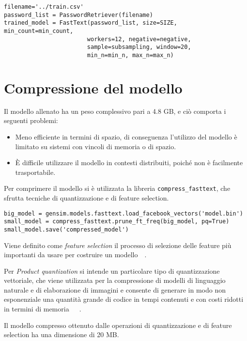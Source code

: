 \begin{verbatim}
filename='../train.csv'
password_list = PasswordRetriever(filename)
trained_model = FastText(password_list, size=SIZE, min_count=min_count,
                        workers=12, negative=negative,
                        sample=subsampling, window=20,
                        min_n=min_n, max_n=max_n)
\end{verbatim}

\section{Compressione del modello}
\label{sec:post-allenamento compressione modello}
Il modello allenato ha un peso complessivo pari a 4.8 GB, e ciò comporta i seguenti problemi:
\begin{itemize}
    \item Meno efficiente in termini di spazio, di conseguenza l'utilizzo del modello è limitato su sistemi con vincoli di memoria o di spazio.
    \item È difficile utilizzare il modello in contesti distribuiti, poiché non è facilmente trasportabile.
\end{itemize}
Per comprimere il modello si è utilizzata la libreria \texttt{compress\_fasttext}, che sfrutta tecniche di quantizzazione e di feature selection.~\cite{compress-fasttext}
\begin{verbatim}
big_model = gensim.models.fasttext.load_facebook_vectors('model.bin')
small_model = compress_fasttext.prune_ft_freq(big_model, pq=True)
small_model.save('compressed_model')
\end{verbatim}

Viene definito come \emph{feature selection} il processo di selezione delle feature più importanti da usare per costruire un modello~\cite{bishop2006pattern}~\cite{feature}.

Per \emph{Product quantization} si intende un particolare tipo di quantizzazione vettoriale, che viene utilizzata per la compressione di modelli di linguaggio naturale e di elaborazione di immagini e consente di generare in modo non esponenziale una quantità grande di codice in tempi contenuti e con costi ridotti in termini di memoria~\cite{bijeeta}~\cite{compress-fasttext}~\cite{quantization}.

Il modello compresso ottenuto dalle operazioni di quantizzazione e di feature selection ha una dimensione di 20 MB.